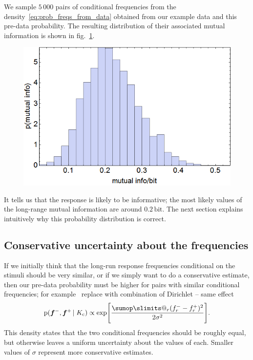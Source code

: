 \documentclass[\ifafour a4paper,12pt,\else a5paper,10pt,\fi%
onecolumn,oneside,article,%
british%
]{memoir}
\makeatletter
\theoremstyle{remark}
\theoremstyle{innote}
\def\sum{\DOTSI\sumop\slimits@}
\newcommand*{\pf}{\mathrm{p}}%
\renewcommand*{\|}{\nonscript\,\vert\nonscript\;\mathopen{}}
\newcommand*{\fig}{fig.}%
\newcommand*{\puzzle}{{\fontencoding{U}\fontfamily{fontawesometwo}\selectfont\symbol{225}}}
\newcommand{\mynote}[1]{ {\color{notecolour}\puzzle\ #1}}
\newcommand*{\yfm}{f^{-}}
\newcommand*{\yfp}{f^{+}}
\newcommand*{\yfvm}{\bm{f}^{-}}
\newcommand*{\yfvp}{\bm{f}^{+}}
\newcommand*{\yIc}{K_{\text{c}}}
\makeatother
\begin{document}
We sample $5\,000$ pairs of conditional frequencies from the
density~\eqref{eq:prob_freqs_from_data} obtained from our example data and
this pre-data probability. The resulting distribution of their associated
mutual information is shown in \fig~\ref{fig:mutual_info_histo_unif}.
\begin{figure}[h!]
\centering\includegraphics[width=0.5\linewidth]{A_mutualinfo_hist.png}\\
\caption{}\label{fig:mutual_info_histo_unif}
\end{figure}%
It tells us that the response is likely to be informative; the most likely
values of the long-range mutual information are around $0.2\,\textrm{bit}$.
The next section explains intuitively why this probability distribution is
correct.

\subsection{Conservative uncertainty about the frequencies}
\label{sec:credib_cons}

If we initially think that the long-run response frequencies conditional on
the stimuli should be very similar, or if we simply want to do a
conservative estimate, then our pre-data probability must be higher for
pairs with similar conditional frequencies; for example \mynote{replace
  with combination of Dirichlet -- same effect}
\begin{equation}
  \label{eq:credib_cons}
  \pf(\yfvm, \yfvp \| \yIc) \propto \exp\Biggl[
\frac{\sum_r(\yfm_r - \yfp_r)^2}{2\sigma^2}
  \Biggr].
\end{equation}
This density states that the two conditional frequencies should be roughly
equal, but otherwise leaves a uniform uncertainty about the values of each.
Smaller values of $\sigma$ represent more conservative estimates.
\end{document}
